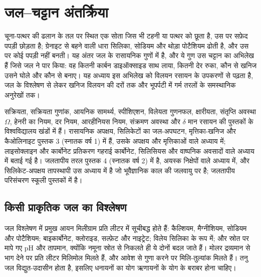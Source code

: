\chapter{जल--चट्टान अंतर्क्रिया}\label{ch:b3:water-rock-interaction}

चूना-पत्थर की ढलान के तल पर स्थित एक सोता जिस भी टहनी या पत्थर को छूता है,
उस पर सफ़ेद पपड़ी छोड़ता है; ग्रेनाइट से बहने वाली धारा सिलिका, सोडियम
और थोड़ा पोटैशियम ढोती है, और उस पर कोई पपड़ी नहीं बनती। यह अंतर
जल के रासायनिक गुणों में है, और ये गुण उस चट्टान का अभिलेख हैं
जिसे जल ने पार किया: वह कितनी कार्बन डाइऑक्साइड साथ लाया, कितनी देर रुका, कौन से
खनिज उसने घोले और कौन से बनाए। यह अध्याय इस अभिलेख को विलयन रसायन के
उपकरणों से पढ़ता है, जल के विश्लेषण से लेकर खनिज विलयन की दरों तक
और भूपर्पटी में गर्म तरलों के समस्थानिक अनुरेखों तक।

\begin{recall}
सक्रियता, सक्रियता गुणांक, आयनिक सामर्थ्य, स्पीशिएशन, विलेयता
गुणनफल, क्षारीयता, संतृप्ति अवस्था $\Omega$, हेनरी का नियम, दर नियम,
आरहीनियस नियम, संक्रमण अवस्था और $\delta$ मान रसायन की पुस्तकों के
विश्वविद्यालय खंडों में हैं। रासायनिक अपक्षय, सिलिकेटों का जल-अपघटन,
मृत्तिका-खनिज और कैओलिनाइट पुस्तक 3 (स्नातक वर्ष 1) में हैं, उसके
अपक्षय और मृत्तिकाओं वाले अध्याय में; लाइसोक्लाइन और कार्बोनेट प्रतिकरण
गहराई कार्बोनेट, सिलिसियस और वाष्पनिक अवसादों वाले अध्याय में बताई गई है।
जलतापीय तरल पुस्तक 4 (स्नातक वर्ष 2) में है, अयस्क निक्षेपों वाले अध्याय में,
और सिलिकेट-अपक्षय तापस्थापी उस अध्याय में है जो भूवैज्ञानिक काल की जलवायु पर है;
जलतापीय परिसंचरण स्कूली पुस्तकों में है।
\end{recall}

\section{किसी प्राकृतिक जल का विश्लेषण}\label{sec:b3:water-rock-interaction:analysis}

जल विश्लेषण में प्रमुख आयन मिलीग्राम प्रति लीटर में सूचीबद्ध होते हैं: कैल्शियम,
मैग्नीशियम, सोडियम और पोटैशियम; बाइकार्बोनेट, क्लोराइड, सल्फ़ेट और नाइट्रेट;
विलेय सिलिका  के रूप में; और स्रोत पर मापे गए pH और तापमान,
क्योंकि नमूना स्रोत से निकलते ही ये दोनों बदल जाते हैं। मोलर द्रव्यमान से भाग देने पर
प्रति लीटर मिलिमोल मिलते हैं, और आवेश से गुणा करने पर
मिलि-तुल्यांक मिलते हैं। तनु जल विद्युत-उदासीन होता है, इसलिए धनायनों का योग
ऋणायनों के योग के बराबर होना चाहिए।

